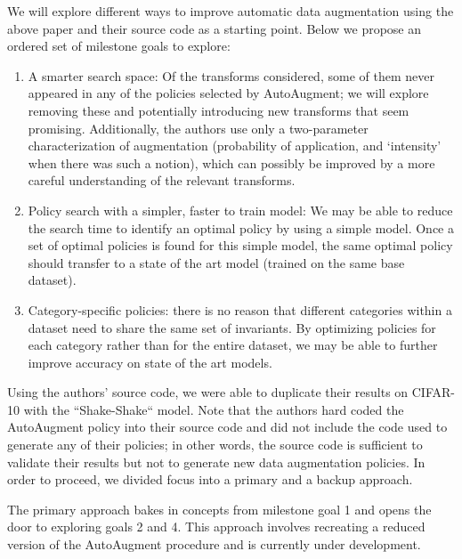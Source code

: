 \documentclass[10pt,twocolumn,letterpaper]{article}
\begin{document}
	We will explore different ways to improve automatic data augmentation using the above paper and their source code as a starting point. Below we propose an ordered set of milestone goals to explore:
	
	\begin{enumerate}
		
		\item %
		A smarter search space: Of the transforms considered, some of them never appeared in any of the policies selected by AutoAugment; we will explore removing these and potentially introducing new transforms that seem promising. Additionally, the authors use only a two-parameter characterization of augmentation (probability of application, and ‘intensity’ when there was such a notion), which can possibly be improved by a more careful understanding of the relevant transforms.
		
		\item %
		Policy search with a simpler, faster to train model: We may be able to reduce the search time to identify an optimal policy by using a simple model. Once a set of optimal policies is found for this simple model, the same optimal policy should transfer to a state of the art model (trained on the same base dataset).
		
		\item %
		Category-specific policies: there is no reason that different categories within a dataset need to share the same set of invariants. By optimizing policies for each category rather than for the entire dataset, we may be able to further improve accuracy on state of the art models.
		
	\end{enumerate}
	
	Using the authors' source code, we were able to duplicate their results on CIFAR-10 with the ``Shake-Shake`` model. Note that the authors hard coded the AutoAugment policy into their source code and did not include the code used to generate any of their policies; in other words, the source code is sufficient to validate their results but not to generate new data augmentation policies. In order to proceed, we divided focus into a primary and a backup approach. 
	
	The primary approach bakes in concepts from milestone goal 1 and opens the door to exploring goals 2 and 4. This approach involves recreating a reduced version of the AutoAugment procedure and is currently under development.
	
\end{document}
